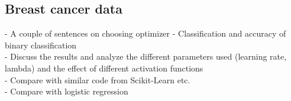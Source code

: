 \subsection{Breast cancer data}
- A couple of sentences on choosing optimizer
- Classification and accuracy of binary classification\\
- Discuss the results and analyze the different parameters used (learning rate, lambda) and the effect of different activation functions\\
- Compare with similar code from Scikit-Learn etc.\\
- Compare with logistic regression\\

